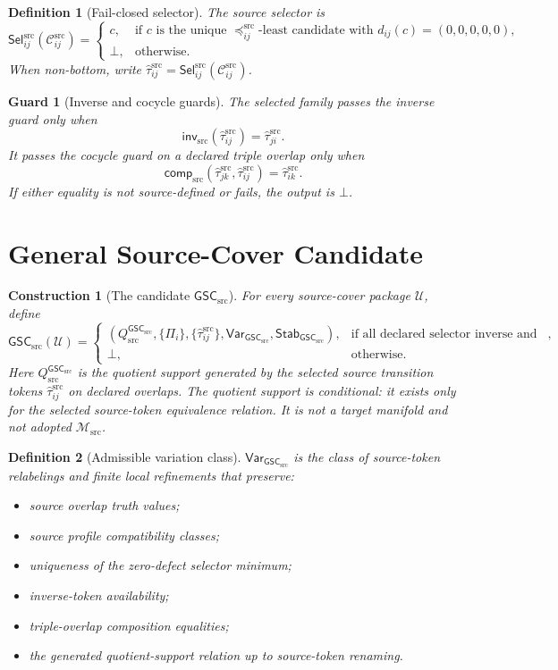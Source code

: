 \documentclass[11pt]{article}
\newcommand{\Msrc}{\mathcal{M}_{\mathrm{src}}}
\newcommand{\GSC}{\mathsf{GSC}_{\mathrm{src}}}
\newcommand{\Vargsc}{\mathsf{Var}_{\GSC}}
\newcommand{\Stabgsc}{\mathsf{Stab}_{\GSC}}
\newcommand{\Cand}{\mathcal{C}^{\mathrm{src}}}
\newcommand{\Sel}{\mathsf{Sel}^{\mathrm{src}}}
\newcommand{\Tau}{\widehat{\tau}^{\mathrm{src}}}
\newcommand{\Qsrc}{Q_{\mathrm{src}}^{\GSC}}
\newcommand{\Bot}{\bot}
\newtheorem{definition}{Definition}
\newtheorem{construction}{Construction}
\newtheorem{guard}{Guard}
\begin{document}
\begin{definition}[Fail-closed selector]
The source selector is
\[
  \Sel_{ij}(\Cand_{ij}) =
  \begin{cases}
    c, & \text{if }c\text{ is the unique }\preceq_{ij}^{\mathrm{src}}
    \text{-least candidate with }d_{ij}(c)=(0,0,0,0,0),\\
    \Bot, & \text{otherwise.}
  \end{cases}
\]
When non-bottom, write \(\Tau_{ij}=\Sel_{ij}(\Cand_{ij})\).
\end{definition}

\begin{guard}[Inverse and cocycle guards]
The selected family passes the inverse guard only when
\[
  \mathsf{inv}_{\mathrm{src}}(\Tau_{ij})=\Tau_{ji}.
\]
It passes the cocycle guard on a declared triple overlap only when
\[
  \mathsf{comp}_{\mathrm{src}}(\Tau_{jk},\Tau_{ij})=\Tau_{ik}.
\]
If either equality is not source-defined or fails, the output is \(\Bot\).
\end{guard}

\section{General Source-Cover Candidate}

\begin{construction}[The candidate \(\GSC\)]
For every source-cover package \(\mathcal U\), define
\[
  \GSC(\mathcal U)=
  \begin{cases}
    (\Qsrc,\{\Pi_i\},\{\Tau_{ij}\},\Vargsc,\Stabgsc),
    & \text{if all declared selector inverse and cocycle guards pass},\\
    \Bot, & \text{otherwise.}
  \end{cases}
\]
Here \(\Qsrc\) is the quotient support generated by the selected source
transition tokens \(\Tau_{ij}\) on declared overlaps. The quotient support is
conditional: it exists only for the selected source-token equivalence relation.
It is not a target manifold and not adopted \(\Msrc\).
\end{construction}

\begin{definition}[Admissible variation class]
\(\Vargsc\) is the class of source-token relabelings and finite local
refinements that preserve:
\begin{itemize}
  \item source overlap truth values;
  \item source profile compatibility classes;
  \item uniqueness of the zero-defect selector minimum;
  \item inverse-token availability;
  \item triple-overlap composition equalities;
  \item the generated quotient-support relation up to source-token renaming.
\end{itemize}
\end{definition}
\end{document}
